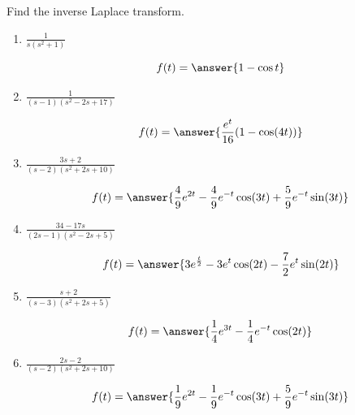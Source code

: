 \documentclass{ximera}
\begin{document}
\begin{problem}\label{exer:8.2.7}
Find the inverse Laplace transform.

\begin{enumerate}
    \item $\frac{1}{s(s^2+1)}$

$$f(t)=\answer{1-\cos{t}}$$
    
    \item $\frac{1}{(s-1)(s^2-2s+17)}$

$$f(t)=\answer{\frac{e^t}{16}(1-\cos(4t))}$$
    
    \item $\frac{3s+2}{(s-2)(s^2+2s+10)}$

$$f(t)=\answer{\frac{4}{9}e^{2t}-\frac{4}{9}e^{-t}\cos(3t)+\frac{5}{9}e^{-t}\sin(3t)}$$
    
    \item $\frac{34-17s}{(2s-1)(s^2-2s+5)}$

$$f(t)=\answer{3e^{\frac{t}{2}}-3e^t\cos(2t)-\frac{7}{2}e^t\sin(2t)}$$
    
    \item $\frac{s+2}{(s-3)(s^2+2s+5)}$

$$f(t)=\answer{\frac{1}{4}e^{3t}-\frac{1}{4}e^{-t}\cos(2t)}$$
    
    \item $\frac{2s-2}{(s-2)(s^2+2s+10)}$

$$f(t)=\answer{\frac{1}{9}e^{2t}-\frac{1}{9}e^{-t}\cos(3t)+\frac{5}{9}e^{-t}\sin(3t)}$$
    
\end{enumerate}
\end{problem}
\end{document}
